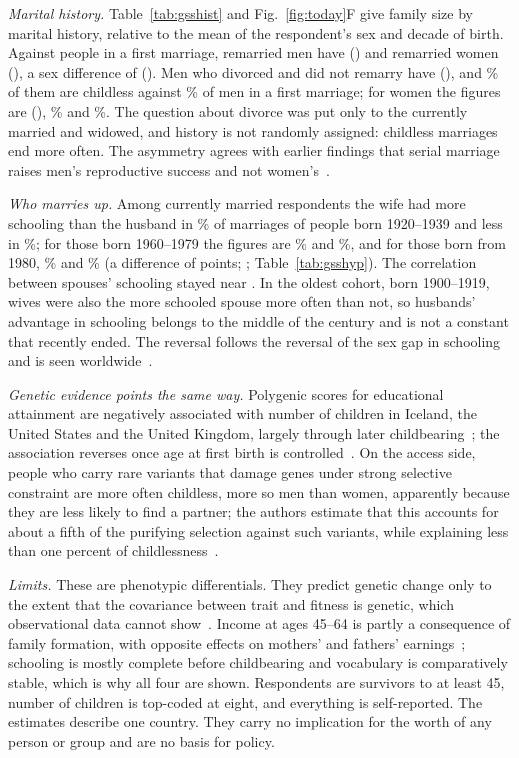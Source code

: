 \emph{Marital history.} Table~\ref{tab:gsshist} and Fig.~\ref{fig:today}F give family size by marital history, relative
to the mean of the respondent's sex and decade of birth. Against people in a first marriage, remarried men have \GssRemM{} (\GssRemMCI) and
remarried women \GssRemW{} (\GssRemWCI), a sex difference of \GssRemDiff{} (\GssRemDiffCI). Men who divorced and did not
remarry have \GssDivM{} (\GssDivMCI), and \GssDivChlM\% of them are childless against \GssIntChlM\% of men in a first
marriage; for women the figures are \GssDivW{} (\GssDivWCI), \GssDivChlW\% and \GssIntChlW\%. The question about divorce
was put only to the currently married and widowed, and history is not randomly assigned: childless marriages end more
often. The asymmetry agrees with earlier findings that serial marriage raises men's reproductive success and not
women's~\cite{jokela2010}.

\emph{Who marries up.} Among currently married respondents the wife had more schooling than the husband in
\GssHypMoreOld\% of marriages of people born 1920--1939 and less in \GssHypLessOld\%; for those born 1960--1979 the figures
are \GssHypMoreNew\% and \GssHypLessNew\%, and for those born from 1980, \GssHypMoreYoung\% and \GssHypLessYoung\%
(a difference of \GssHypDiffYoung{} points; \GssHypDiffYoungCI; Table~\ref{tab:gsshyp}). The correlation between spouses'
schooling stayed near \GssHypR. In the oldest cohort, born 1900--1919, wives were also the more schooled spouse more often
than not, so husbands' advantage in schooling belongs to the middle of the century and is not a constant that recently
ended. The reversal follows the reversal of the sex gap in schooling and is seen
worldwide~\cite{esteve2016}.

\emph{Genetic evidence points the same way.} Polygenic scores for educational attainment are negatively associated with
number of children in Iceland, the United States and the United Kingdom, largely through later
childbearing~\cite{kong2017,beauchamp2016,hughjones2022,barban2016}; the association reverses once age at first birth is
controlled~\cite{hughjones2022}. On the access side, people who carry rare variants that damage genes under strong selective
constraint are more often childless, more so men than women, apparently because they are less likely to find a partner; the
authors estimate that this accounts for about a fifth of the purifying selection against such variants, while explaining less
than one percent of childlessness~\cite{gardner2022}.

\emph{Limits.} These are phenotypic differentials. They predict genetic change only to the extent that the covariance
between trait and fitness is genetic, which observational data cannot show~\cite{morrissey2010}. Income at ages 45--64 is partly
a consequence of family formation, with opposite effects on mothers' and fathers' earnings~\cite{kleven2019}; schooling is
mostly complete before childbearing and vocabulary is comparatively stable, which is why all four are shown. Respondents
are survivors to at least 45, number of children is top-coded at eight, and everything is self-reported. The estimates
describe one country. They carry no implication for the worth of any person or group and are no basis for policy.

